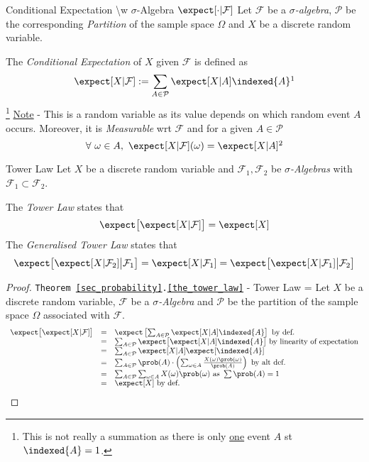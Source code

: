 \documentclass[11pt,a4paper]{article}
\begin{document}
  \begin{definition}{Conditional Expectation \textbackslash{w} $\sigma$-Algebra $\expect[\cdot|\mathcal{F}]$}
    Let $\mathcal{F}$ be a \textit{$\sigma$-algebra}, $\mathcal{P}$ be the corresponding \textit{Partition} of the sample space $\Omega$ and $X$ be a discrete random variable.
    \par The \textit{Conditional Expectation} of $X$ given $\mathcal{F}$ is defined as
    \[ \expect[X|\mathcal{F}]:=\sum_{A\in\mathcal{P}}\expect[X|A]\indexed\{A\}\footnotemark \]
    \footnote{This is not really a summation as there is only \underline{one} event $A$ st $\indexed\{A\}=1$.}
    \underline{Note} - This is a random variable as its value depends on which random event $A$ occurs. Moreover, it is \textit{Measurable} wrt $\mathcal{F}$ and for a given $A\in\mathcal{P}$
    \[ \forall\ \omega\in A,\ \expect[X|\mathcal{F}](\omega)=\expect[X|A]\footnotemark \]
  \end{definition}

  \begin{theorem}{Tower Law}\label{the_tower_law}
    Let $X$ be a discrete random variable and $\mathcal{F}_1,\mathcal{F}_2$ be \textit{$\sigma$-Algebras} with $\mathcal{F}_1\subset\mathcal{F}_2$.
    \par The \textit{Tower Law} states that
    \[ \expect\big[\expect[X|\mathcal{F}]\big]=\expect[X] \]
    The \textit{Generalised Tower Law} states that
    \[ \expect\big[\expect[X|\mathcal{F}_2]\big|\mathcal{F}_1\big] = \expect[X|\mathcal{F}_1] = \expect\big[\expect[X|\mathcal{F}_1]\big|\mathcal{F}_2\big] \]
  \end{theorem}

  \begin{proof}{\texttt{Theorem \ref{sec_probability}.\ref{the_tower_law}} - Tower Law}
    \everymath={\displaystyle}
    Let $X$ be a discrete random variable, $\mathcal{F}$ be a \textit{$\sigma$-Algebra} and $\mathcal{P}$ be the partition of the sample space $\Omega$ associated with $\mathcal{F}$.
    \[\begin{array}{rcl}
      \expect\big[\expect[X|\mathcal{F}]\big]&=&\expect\left[\sum_{A\in\mathcal{P}}\expect[X|A]\indexed\{A\}\right]\text{ by def.}\\
      &=&\sum_{A\in\mathcal{P}}\expect\big[\expect[X|A]\indexed\{A\}\big]\text{ by linearity of expectation}\\
      &=&\sum_{A\in\mathcal{P}}\expect[X|A]\expect[\indexed\{A\}]\\
      &=&\sum_{A\in\mathcal{P}}\prob(A)\cdot\left(\sum_{\omega\in A}\frac{X(\omega)\prob(\omega)}{\prob(A)}\right)\text{ by alt def.}\\
      &=&\sum_{A\in\mathcal{P}}\sum_{\omega\in A}X(\omega)\prob(\omega)\text{ as }\sum \prob(A)=1\\
      &=&\expect[X]\text{ by def.}
    \end{array}\]\proved
  \end{proof}
\end{document}
